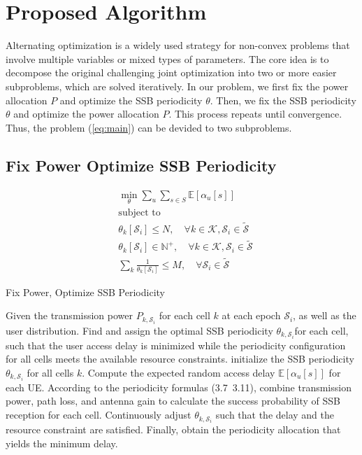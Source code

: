 \chapter{Proposed Algorithm}
\label{chap:algorithm}
Alternating optimization is a widely used strategy for non-convex problems that involve multiple variables or mixed types of parameters. The core idea is to decompose the original challenging joint optimization into two or more easier subproblems, which are solved iteratively. In our problem, we first fix the power allocation $P$ and optimize the SSB periodicity $\theta$. Then, we fix the SSB periodicity $\theta$ and optimize the power allocation $P$. This process repeats until convergence. Thus, the problem (\ref{eq:main}) can be devided to two subproblems. 

\section{Fix Power Optimize SSB Periodicity}

\begin{subequations} \label{eq:FPOS}
\begin{align}
    &\min_{\theta} \sum_{u} \sum_{s\in S} \mathbb{E}[\alpha_u[s]] \\ 
    &\text{subject to} \nonumber \\
    &\theta_k[\mathcal{S}_i] \leq N, \quad \forall k\in\mathcal{K}, \mathcal{S}_i\in\mathcal{\widetilde{S}} \\
    &\theta_k[\mathcal{S}_i] \in \mathbb{N}^+, \quad \forall k\in\mathcal{K}, \mathcal{S}_i\in\mathcal{\widetilde{S}} \\
    &\sum_k \frac{1}{\theta_k[\mathcal{S}_i]} \leq M, \quad \forall \mathcal{S}_i\in\mathcal{\widetilde{S}}
\end{align}
\end{subequations}

\begin{algorithm}[H]
    \caption{Fix Power, Optimize SSB Periodicity}
    \label{alg:FPOS}
    \begin{algorithmic}[1]
        \REQUIRE{}
        Given the transmission power $P_{k, \mathcal{S}_i}$ for each cell $k$ at each epoch $\mathcal{S}_i$, as well as the user distribution.
        \ENSURE
        Find and assign the optimal SSB periodicity $\theta_{k,\mathcal{S}_i}$for each cell, such that the user access delay is minimized while the periodicity configuration for all cells meets the available resource constraints.
        \STATE initialize the SSB periodicity $\theta_{k,\mathcal{S}_i}$ for all cells $k$. 
        \STATE Compute the expected random access delay $\mathbb{E}[\alpha_u[s]]$ for each UE. 
        \STATE According to the periodicity formulas (3.7~3.11), combine transmission power, path loss, and antenna gain to calculate the success probability of SSB reception for each cell.
        \STATE Continuously adjust $\theta_{k,\mathcal{S}_i}$ such that the delay and the resource constraint are satisfied.
        \STATE Finally, obtain the periodicity allocation that yields the minimum delay.
        \ENDFOR
    \end{algorithmic}
\end{algorithm}


